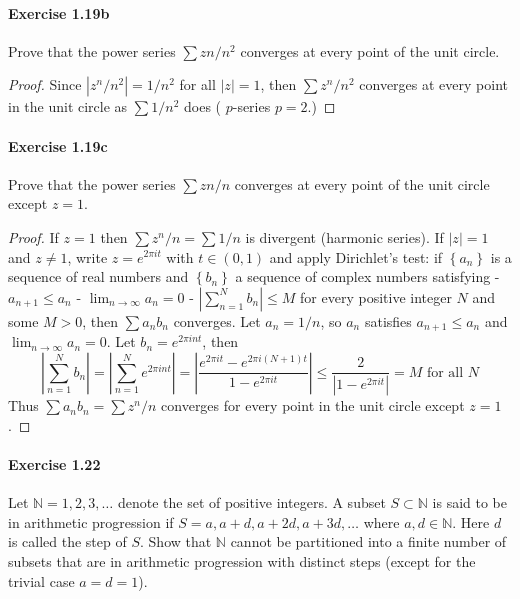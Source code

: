 \documentclass{article}
\begin{document}
\paragraph{Exercise 1.19b} Prove that the power series $\sum zn/n^2$ converges at every point of the unit circle.
\begin{proof}
    Since $\left|z^n / n^2\right|=1 / n^2$ for all $|z|=1$, then $\sum z^n / n^2$ converges at every point in the unit circle as $\sum 1 / n^2$ does ( $p$-series $p=2$.)
\end{proof}



\paragraph{Exercise 1.19c} Prove that the power series $\sum zn/n$ converges at every point of the unit circle except $z = 1$.
\begin{proof}
    If $z=1$ then $\sum z^n / n=\sum 1 / n$ is divergent (harmonic series). If $|z|=1$ and $z \neq 1$, write $z=e^{2 \pi i t}$ with $t \in(0,1)$ and apply Dirichlet's test: if $\left\{a_n\right\}$ is a sequence of real numbers and $\left\{b_n\right\}$ a sequence of complex numbers satisfying
- $a_{n+1} \leq a_n$
- $\lim _{n \rightarrow \infty} a_n=0$
- $\left|\sum_{n=1}^N b_n\right| \leq M$ for every positive integer $N$ and some $M>0$,
then $\sum a_n b_n$ converges. Let $a_n=1 / n$, so $a_n$ satisfies $a_{n+1} \leq a_n$ and $\lim _{n \rightarrow \infty} a_n=0$. Let $b_n=e^{2 \pi i n t}$, then
$$
\left|\sum_{n=1}^N b_n\right|=\left|\sum_{n=1}^N e^{2 \pi i n t}\right|=\left|\frac{e^{2 \pi i t}-e^{2 \pi i(N+1) t}}{1-e^{2 \pi i t}}\right| \leq \frac{2}{\left|1-e^{2 \pi i t}\right|}=M \text { for all } N
$$
Thus $\sum a_n b_n=\sum z^n / n$ converges for every point in the unit circle except $z=1$.
\end{proof}



\paragraph{Exercise 1.22} Let $\mathbb{N} = {1, 2, 3, \ldots}$ denote the set of positive integers. A subset $S \subset \mathbb{N}$ is said to be in arithmetic progression if $S = {a, a + d, a + 2d, a + 3d, \ldots}$ where $a, d \in \mathbb{N}$. Here $d$ is called the step of $S$.  Show that $\mathbb{N}$ cannot be partitioned into a finite number of subsets that are in arithmetic progression with distinct steps (except for the trivial case $a = d = 1$).
\end{document}
